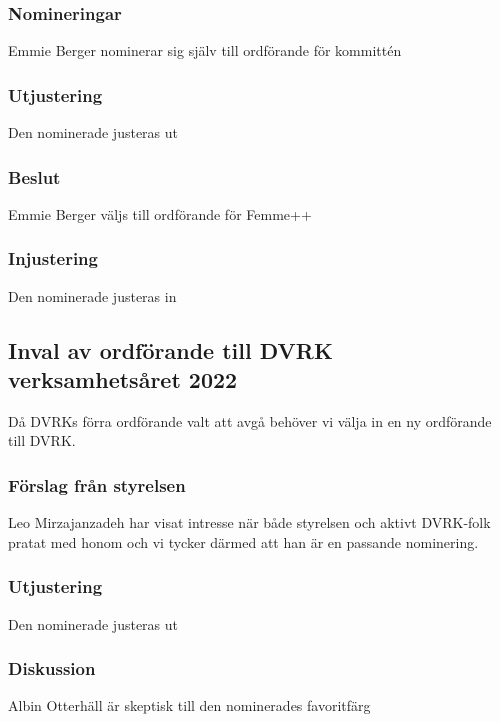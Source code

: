 \documentclass[protokoll]{dvd}
\begin{document}
    \subsubsection*{Nomineringar}
    Emmie Berger nominerar sig själv till ordförande för kommittén

    \subsubsection*{Utjustering}
    Den nominerade justeras ut

    \subsubsection*{Beslut}
        \begin{attsatser}
            \item Emmie Berger väljs till ordförande för Femme++
        \end{attsatser}

    \subsubsection*{Injustering}
    Den nominerade justeras in

\subsection{Inval av ordförande till DVRK verksamhetsåret 2022}
Då DVRKs förra ordförande valt att avgå behöver vi välja in en ny ordförande till DVRK.

    \subsubsection*{Förslag från styrelsen}
    Leo Mirzajanzadeh har visat intresse när både styrelsen och aktivt DVRK-folk pratat med honom och vi tycker därmed att han är en passande nominering.

    \subsubsection*{Utjustering}
    Den nominerade justeras ut

    \subsubsection*{Diskussion}
    Albin Otterhäll är skeptisk till den nominerades favoritfärg
\end{document}
